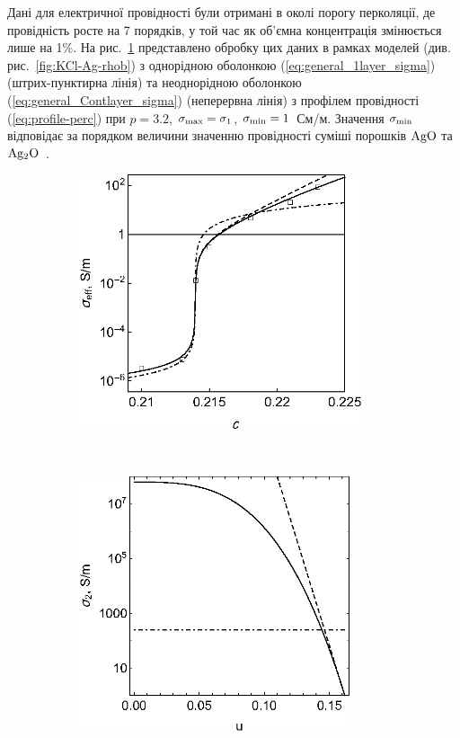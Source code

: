 \documentclass[14pt,twoside]{vakthesis}
\begin{document}
Дані для електричної провідності \cite{ChenI.-G.1986} були отримані в околі порогу перколяції, де провідність росте на 7 порядків, у той час як об'ємна концентрація змінюється лише на 1\%. 
На рис.~\ref{fig:KCl-Ag-rhoa} представлено обробку цих даних в рамках моделей (див. рис.~\ref{fig:KCl-Ag-rhob}) з однорідною оболонкою (\ref{eq:general_1layer_sigma}) (штрих-пунктирна лінія) та неоднорідною оболонкою (\ref{eq:general_Contlayer_sigma}) (неперервна лінія) з профілем провідності (\ref{eq:profile-perc}) при $p=3.2$, $\sigma_{\rm max} = \sigma_1$, $\sigma_{\rm min} = 1$~См/м. Значення $\sigma_{\rm min}$ відповідає за порядком величини значенню провідності суміші порошків $\rm AgO$ та $\rm Ag_2O$~\cite{Tvarusko1968}. 

\begin{figure}[tb]
	\centering
	\begin{subfigure}[c]{0.49\textwidth}
		\includegraphics[height=75mm]{chen-grannan-s2-lin.eps}
		\caption{} \label{fig:KCl-Ag-rhoa}
	\end{subfigure}%
	~
	\begin{subfigure}[c]{0.49\textwidth}
		\includegraphics[height=75mm]{chen-grannan-profile-lin-ar1.eps}

\end{subfigure}
\end{figure}
\end{document}
